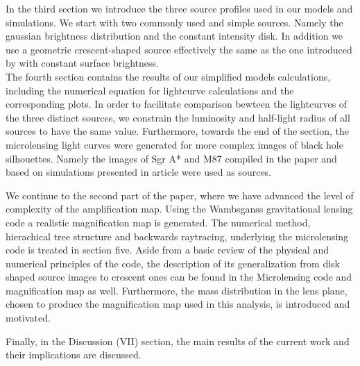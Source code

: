 In the third section we introduce the three source profiles used in our models and simulations. We start with two commonly used and simple sources. Namely the gaussian brightness distribution and the constant intensity disk. In addition we use a geometric crescent-shaped source effectively the same as the one introduced by \citep{2013MNRAS.434..765K} with constant surface brightness. \\ The fourth section contains the results of our simplified models calculations, including the numerical equation for lightcurve calculations and the corresponding plots. 
In order to facilitate comparison bewteen the lightcurves of the three distinct sources, we constrain the luminosity and half-light radius of all sources to have the same value. 
Furthermore, towards the end of the section, the microlensing light curves were generated for more complex images of black hole silhouettes. 
Namely the images of Sgr A* and M87 compiled in the paper \citep{2015MNRAS.446.1973R} and based on simulations presented in \citep{2009MNRAS.394L.126M} article were used as sources.     
       
We continue to the second part of the paper, where we have advanced the level of complexity of the amplification map. Using the Wambsganss gravitational lensing code \citep{1990LNP...360..186W} a realistic magnification map is generated. The numerical method, hierachical tree structure and backwards raytracing, underlying the microlensing code is treated in section five. Aside from a basic review of the physical and numerical principles of the code, the description of its generalization from disk shaped source images to crescent ones can be found in the Microlensing code and magnification map as well. Furthermore, the mass distribution in the lens plane, chosen to produce the magnification map used in this analysis, is introduced and motivated.   



Finally, in the Discussion (VII) section, the main results of the current work and their implications are discussed. 
